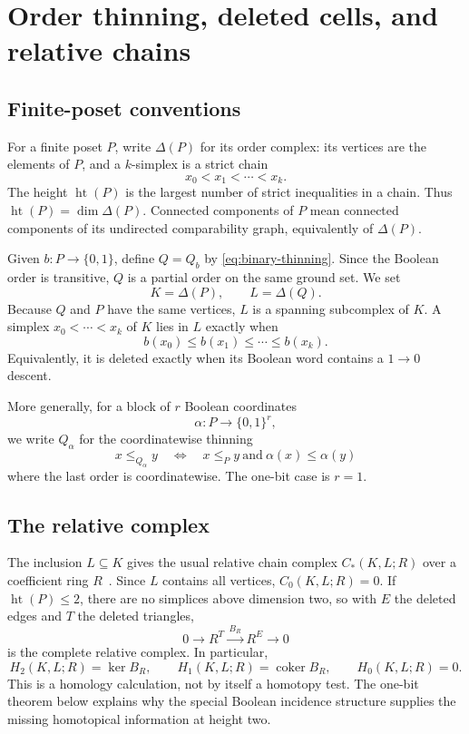 \documentclass[11pt]{article}
\theoremstyle{definition}
\theoremstyle{remark}
\DeclareMathOperator{\posht}{ht}
\newcommand{\D}{\Delta}
\begin{document}
\section{Order thinning, deleted cells, and relative chains}\label{sec:setup}

\subsection{Finite-poset conventions}

For a finite poset $P$, write $\D(P)$ for its order complex: its vertices are the
elements of $P$, and a $k$-simplex is a strict chain
\[
  x_0<x_1<\cdots<x_k.
\]
The height $\posht(P)$ is the largest number of strict inequalities in a chain.  Thus
$\posht(P)=\dim\D(P)$.  Connected components of $P$ mean connected components of its
undirected comparability graph, equivalently of $\D(P)$.

Given $b:P\to\{0,1\}$, define $Q=Q_b$ by \eqref{eq:binary-thinning}.  Since the
Boolean order is transitive, $Q$ is a partial order on the same ground set.  We set
\[
  K=\D(P),\qquad L=\D(Q).
\]
Because $Q$ and $P$ have the same vertices, $L$ is a spanning subcomplex of $K$.
A simplex $x_0<\cdots<x_k$ of $K$ lies in $L$ exactly when
\[
  b(x_0)\le b(x_1)\le\cdots\le b(x_k).
\]
Equivalently, it is deleted exactly when its Boolean word contains a $1\to0$ descent.

More generally, for a block of $r$ Boolean coordinates
\[
  \alpha:P\longrightarrow\{0,1\}^r,
\]
we write $Q_\alpha$ for the coordinatewise thinning
\begin{equation}\label{eq:block-thinning}
  x\le_{Q_\alpha}y
  \quad\Longleftrightarrow\quad
  x\le_Py\ \text{and}\ \alpha(x)\le\alpha(y)
\end{equation}
where the last order is coordinatewise.  The one-bit case is $r=1$.

\subsection{The relative complex}

The inclusion $L\subseteq K$ gives the usual relative chain complex
$C_*(K,L;R)$ over a coefficient ring $R$~\cite{Hatcher2002}.  Since $L$ contains all
vertices, $C_0(K,L;R)=0$.  If $\posht(P)\le2$, there are no simplices above dimension two,
so with $E$ the deleted edges and $T$ the deleted triangles,
\begin{equation}\label{eq:relative-two-layer}
  0\longrightarrow R^T
  \xrightarrow{\,B_R\,}
  R^E\longrightarrow0
\end{equation}
is the complete relative complex.  In particular,
\begin{equation}\label{eq:relative-homology-basic}
  H_2(K,L;R)=\ker B_R,
  \qquad
  H_1(K,L;R)=\operatorname{coker}B_R,
  \qquad H_0(K,L;R)=0.
\end{equation}
This is a homology calculation, not by itself a homotopy test.  The one-bit theorem
below explains why the special Boolean incidence structure supplies the missing
homotopical information at height two.
\end{document}
